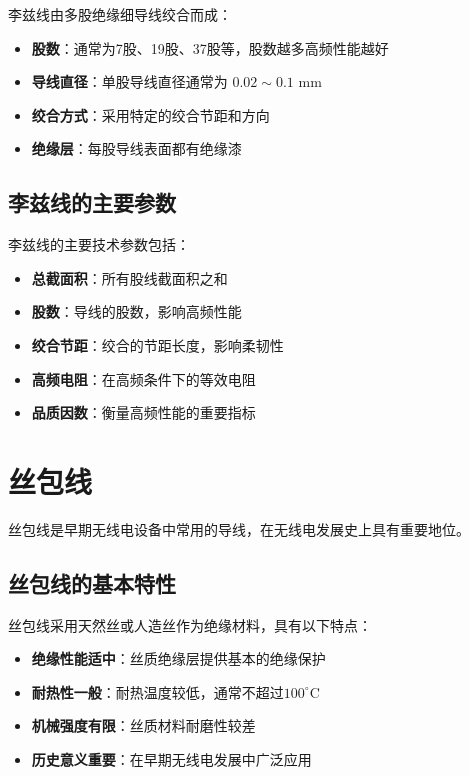 \documentclass[12pt,UTF8]{ctexbook}
\begin{document}
李兹线由多股绝缘细导线绞合而成：

\begin{itemize}[leftmargin=3.5em]
    \item \textbf{股数}：通常为7股、19股、37股等，股数越多高频性能越好
    \item \textbf{导线直径}：单股导线直径通常为 $0.02 \sim 0.1$ mm
    \item \textbf{绞合方式}：采用特定的绞合节距和方向
    \item \textbf{绝缘层}：每股导线表面都有绝缘漆
\end{itemize}

\subsection{李兹线的主要参数}

李兹线的主要技术参数包括：

\begin{itemize}[leftmargin=3.5em]
    \item \textbf{总截面积}：所有股线截面积之和
    \item \textbf{股数}：导线的股数，影响高频性能
    \item \textbf{绞合节距}：绞合的节距长度，影响柔韧性
    \item \textbf{高频电阻}：在高频条件下的等效电阻
    \item \textbf{品质因数}：衡量高频性能的重要指标
\end{itemize}

\section{丝包线}

丝包线是早期无线电设备中常用的导线，在无线电发展史上具有重要地位。

\subsection{丝包线的基本特性}

丝包线采用天然丝或人造丝作为绝缘材料，具有以下特点：

\begin{itemize}[leftmargin=3.5em]
    \item \textbf{绝缘性能适中}：丝质绝缘层提供基本的绝缘保护
    \item \textbf{耐热性一般}：耐热温度较低，通常不超过$100^\circ$C
    \item \textbf{机械强度有限}：丝质材料耐磨性较差
    \item \textbf{历史意义重要}：在早期无线电发展中广泛应用
\end{itemize}
\end{document}
